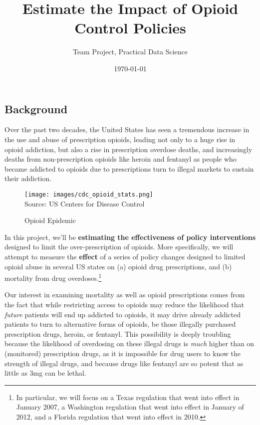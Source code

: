 \documentclass[12pt]{article}
\title{Estimate the Impact of Opioid Control Policies}
\author{Team Project, Practical Data Science}
\date{\today}
\begin{document}
\maketitle

\subsection*{Background}

Over the past two decades, the United States has seen a tremendous increase in the use and abuse of prescription opioids, leading not only to a huge rise in opioid addiction, but also a rise in prescription overdose deaths, and increasingly deaths from non-prescription opioids like heroin and fentanyl as people who became addicted to opioids due to prescriptions turn to illegal markets to sustain their addiction.

\begin{figure}[h!]
  \centering
  \caption{Opioid Epidemic}\label{}
  \texttt{[image: images/cdc\_opioid\_stats.png]}\\
  \scriptsize{Source: US Centers for Disease Control}
\end{figure}

In this project, we'll be \textbf{estimating the effectiveness of policy interventions} designed to limit the over-prescription of opioids. More specifically, we will attempt to measure the \textbf{effect} of a series of policy changes designed to limited opioid abuse in several US states on (a) opioid drug prescriptions, and (b) mortality from drug overdoses.\footnote{ In particular, we will focus on a Texas regulation that went into effect in January 2007, a Washington regulation that went into effect in January of 2012, and a Florida regulation that went into effect in 2010.}

Our interest in examining mortality as well as opioid prescriptions comes from the fact that while restricting access to opioids may reduce the likelihood that \emph{future} patients will end up addicted to opioids, it may drive already addicted patients to turn to alternative forms of opioids, be those illegally purchased prescription drugs, heroin, or fentanyl. This possibility is deeply troubling because the likelihood of overdosing on these illegal drugs is \emph{much} higher than on (monitored) prescription drugs, as it is impossible for drug users to know the strength of illegal drugs, and because drugs like fentanyl are so potent that as little as 3mg can be lethal.
\end{document}
